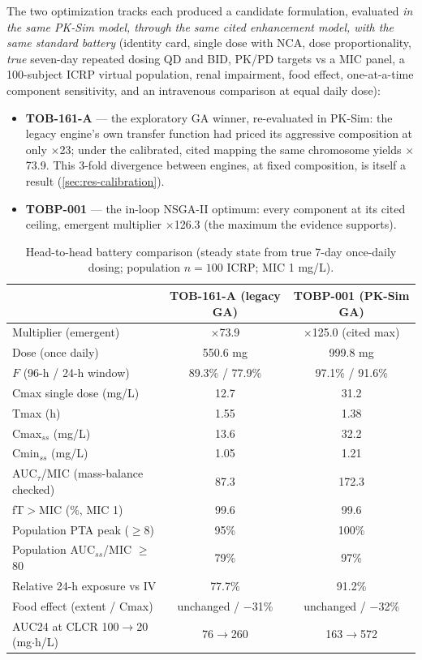 The two optimization tracks each produced a candidate formulation, evaluated \emph{in the same PK-Sim model, through the same cited enhancement model, with the same standard battery} (identity card, single dose with NCA, dose proportionality, \emph{true} seven-day repeated dosing QD and BID, PK/PD targets vs a MIC panel, a 100-subject ICRP virtual population, renal impairment, food effect, one-at-a-time component sensitivity, and an intravenous comparison at equal daily dose):

\begin{itemize}
\item \textbf{TOB-161-A} --- the exploratory GA winner, re-evaluated in PK-Sim: the legacy engine's own transfer function had priced its aggressive composition at only $\times$23; under the calibrated, cited mapping the same chromosome yields $\times$73.9. This 3-fold divergence between engines, at fixed composition, is itself a result (\cref{sec:res-calibration}).
\item \textbf{TOBP-001} --- the in-loop NSGA-II optimum: every component at its cited ceiling, emergent multiplier $\times$126.3 (the maximum the evidence supports).
\end{itemize}

\begin{table}[htbp]
\centering
\caption{Head-to-head battery comparison (steady state from true 7-day once-daily dosing; population $n=100$ ICRP; MIC 1 mg/L).}
\label{tab:res-battery-comparison}
\small
\begin{tabular}{p{6.2cm}cc}
\toprule
 & TOB-161-A (legacy GA) & TOBP-001 (PK-Sim GA) \\
\midrule
Multiplier (emergent) & $\times$73.9 & $\times$125.0 (cited max) \\
Dose (once daily) & 550.6 mg & 999.8 mg \\
$F$ (96-h / 24-h window) & 89.3\% / 77.9\% & 97.1\% / 91.6\% \\
Cmax single dose (mg/L) & 12.7 & 31.2 \\
Tmax (h) & 1.55 & 1.38 \\
Cmax$_{ss}$ (mg/L) & 13.6 & 32.2 \\
Cmin$_{ss}$ (mg/L) & 1.05 & 1.21 \\
AUC$_{\tau}$/MIC (mass-balance checked) & 87.3 & 172.3 \\
fT$>$MIC (\%, MIC 1) & 99.6 & 99.6 \\
Population PTA peak ($\geq$8) & 95\% & 100\% \\
Population AUC$_{ss}$/MIC $\geq$80 & 79\% & 97\% \\
Relative 24-h exposure vs IV & 77.7\% & 91.2\% \\
Food effect (extent / Cmax) & unchanged / $-$31\% & unchanged / $-$32\% \\
AUC24 at CLCR 100$\to$20 (mg$\cdot$h/L) & 76$\to$260 & 163$\to$572 \\
\bottomrule
\end{tabular}
\end{table}

